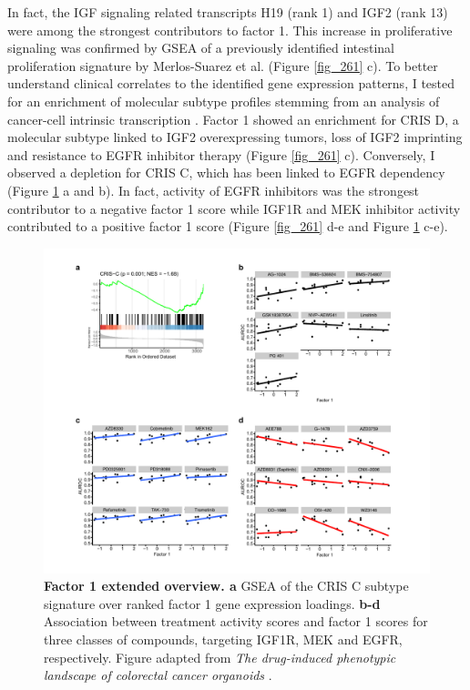 \begin{flushleft}
In fact, the IGF signaling related transcripts H19 (rank 1) and IGF2 (rank 13) were among the strongest contributors to factor 1. This increase in proliferative signaling was confirmed by GSEA of a previously identified intestinal proliferation signature by Merlos-Suarez et al. \parencite{merlos-suarezIntestinalStemCell2011} (Figure \ref{fig_261} c). To better understand clinical correlates to the identified gene expression patterns, I tested for an enrichment of molecular subtype profiles stemming from an analysis of cancer-cell intrinsic transcription \parencite{isellaSelectiveAnalysisCancercell2017}. Factor 1 showed an enrichment for CRIS D, a molecular subtype linked to IGF2 overexpressing tumors, loss of IGF2 imprinting and resistance to EGFR inhibitor therapy (Figure \ref{fig_261} c). Conversely, I observed a depletion for CRIS C, which has been linked to EGFR dependency (Figure \ref{fig_262} a and b). In fact, activity of EGFR inhibitors was the strongest contributor to a negative factor 1 score while IGF1R and MEK inhibitor activity contributed to a positive factor 1 score (Figure \ref{fig_261} d-e and Figure \ref{fig_262} c-e).

\begin{figure}[h!]
\centering
\includegraphics[width=\textwidth,
                height=\textheight,
                keepaspectratio]{figures/promise/pdf/fig_6_2_1.pdf}
\caption[Factor 1 extended overview]{\textbf{Factor 1 extended overview. a} GSEA of the CRIS C subtype signature over ranked factor 1 gene expression loadings. \textbf{b-d} Association between treatment activity scores and factor 1 scores for three classes of compounds, targeting IGF1R, MEK and EGFR, respectively. Figure adapted from \textit{The drug-induced phenotypic landscape of colorectal cancer organoids} \parencite{betgeDruginducedPhenotypicLandscape2022}.}
\label{fig_262}
\end{figure}
\bigbreak


\end{flushleft}
